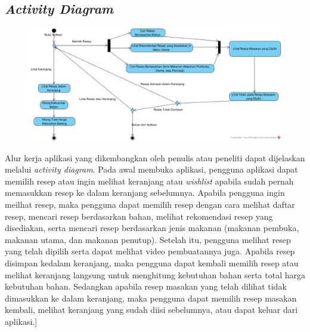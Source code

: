 	\subsection{\emph{Activity Diagram}}
		\begin{figure}[H]
			\centering
			\includegraphics[origin=c,width=1\textwidth]{gambar/activity_diagram_v2}
		\end{figure}
		Alur kerja aplikasi yang dikembangkan oleh penulis atau peneliti dapat dijelaskan melalui \textit{activity diagram}. Pada awal membuka aplikasi, pengguna aplikasi dapat memilih resep atau ingin melihat keranjang atau \textit{wishlist} apabila sudah pernah memasukkan resep ke dalam keranjang sebelumnya. Apabila pengguna ingin meilhat resep, maka pengguna dapat memilih resep dengan cara melihat daftar resep, mencari resep berdasarkan bahan, melihat rekomendasi resep yang disediakan, serta mencari resep berdasarkan jenis makanan (makanan pembuka, makanan utama, dan makanan penutup). Setelah itu, pengguna melihat resep yang telah dipilih serta dapat melihat video pembuatannya juga. Apabila resep disimpan kedalam keranjang, maka pengguna dapat kembali memilih resep atau melihat keranjang langsung untuk menghitung kebutuhan bahan serta total harga kebutuhan bahan. Sedangkan apabila resep masakan yang telah dilihat tidak dimasukkan ke dalam keranjang, maka pengguna dapat memilih resep masakan kembali, melihat keranjang yang sudah diisi sebelumnya, atau dapat keluar dari aplikasi.] 
